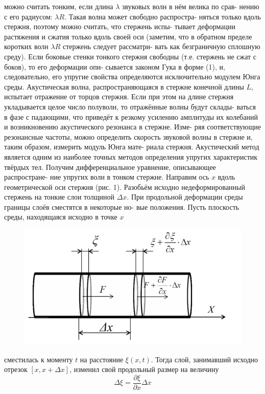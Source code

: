 \documentclass[a4, 12pt]{article}
\begin{document}
можно считать тонким, если длина $\lambda$ звуковых волн в нём велика по срав-
нению с его радиусом: $\lambda R$. Такая волна может свободно распростра-
няться только вдоль стержня, поэтому можно считать, что стержень испы-
тывает деформации растяжения и сжатия только вдоль своей оси (заметим,
что в обратном пределе коротких волн $\lambda R$ стержень следует рассматри-
вать как безграничную сплошную среду). Если боковые стенки тонкого
стержня свободны (т.е. стержень не сжат с боков), то его деформации опи-
сывается законом Гука в форме (1), и, следовательно, его упругие свойства
определяются исключительно модулем Юнга среды.
Акустическая волна, распространяющаяся в стержне конечной длины $L$,
испытает отражение от торцов стержня. Если при этом на длине стержня
укладывается целое число полуволн, то отражённые волны будут склады-
ваться в фазе с падающими, что приведёт к резкому усилению амплитуды
их колебаний и возникновению акустического резонанса в стержне. Изме-
ряя соответствующие резонансные частоты, можно определить скорость
звуковой волны в стержне и, таким образом, измерить модуль Юнга мате-
риала стержня. Акустический метод является одним из наиболее точных
методов определения упругих характеристик твёрдых тел.
Получим дифференциальное уравнение, описывающее распростране-
ние упругих волн в тонком стержне.
Направим ось $x$ вдоль геометрической оси стержня (рис. 1). Разобьём
исходно недеформированный стержень на тонкие слои толщиной $\Delta x$. При
продольной деформации среды границы слоёв сместятся в некоторые но-
вые положения. Пусть плоскость среды, находящаяся исходно в точке $x$
\begin{figure}[H]
    \centering
    \includegraphics[scale = 1.5]{scheme.png}
    \caption{}
\end{figure}
сместилась к моменту $t$ на расстояние $\xi(x, t)$. Тогда слой, занимавший исходно
отрезок $[x, x+\Delta x]$, изменил свой продольный размер на величину $$\Delta \xi =
\frac{\partial \xi}{\partial x}\Delta x$$
\end{document}
